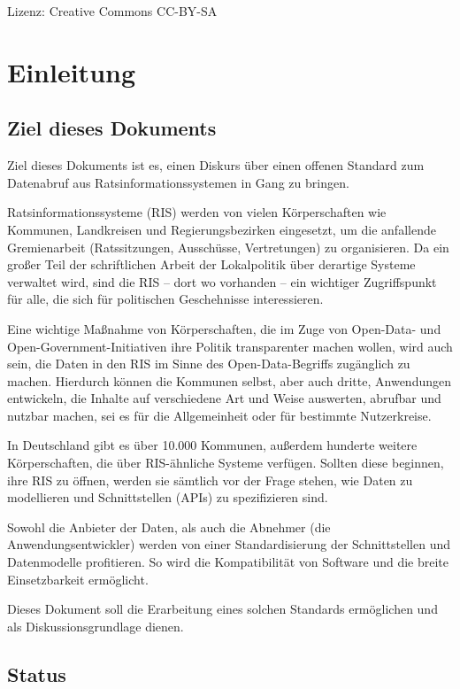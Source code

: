 Lizenz: Creative Commons CC-BY-SA

\section{Einleitung}

\subsection{Ziel dieses Dokuments}

Ziel dieses Dokuments ist es, einen Diskurs über einen offenen Standard
zum Datenabruf aus Ratsinformationssystemen in Gang zu bringen.

Ratsinformationssysteme (RIS) werden von vielen Körperschaften wie
Kommunen, Landkreisen und Regierungsbezirken eingesetzt, um die
anfallende Gremienarbeit (Ratssitzungen, Ausschüsse, Vertretungen) zu
organisieren. Da ein großer Teil der schriftlichen Arbeit der
Lokalpolitik über derartige Systeme verwaltet wird, sind die RIS -- dort
wo vorhanden -- ein wichtiger Zugriffspunkt für alle, die sich für
politischen Geschehnisse interessieren.

Eine wichtige Maßnahme von Körperschaften, die im Zuge von Open-Data-
und Open-Government-Initiativen ihre Politik transparenter machen
wollen, wird auch sein, die Daten in den RIS im Sinne des
Open-Data-Begriffs zugänglich zu machen. Hierdurch können die Kommunen
selbst, aber auch dritte, Anwendungen entwickeln, die Inhalte auf
verschiedene Art und Weise auswerten, abrufbar und nutzbar machen, sei
es für die Allgemeinheit oder für bestimmte Nutzerkreise.

In Deutschland gibt es über 10.000 Kommunen, außerdem hunderte weitere
Körperschaften, die über RIS-ähnliche Systeme verfügen. Sollten diese
beginnen, ihre RIS zu öffnen, werden sie sämtlich vor der Frage stehen,
wie Daten zu modellieren und Schnittstellen (APIs) zu spezifizieren
sind.

Sowohl die Anbieter der Daten, als auch die Abnehmer (die
Anwendungsentwickler) werden von einer Standardisierung der
Schnittstellen und Datenmodelle profitieren. So wird die Kompatibilität
von Software und die breite Einsetzbarkeit ermöglicht.

Dieses Dokument soll die Erarbeitung eines solchen Standards ermöglichen
und als Diskussionsgrundlage dienen.

\subsection{Status}

